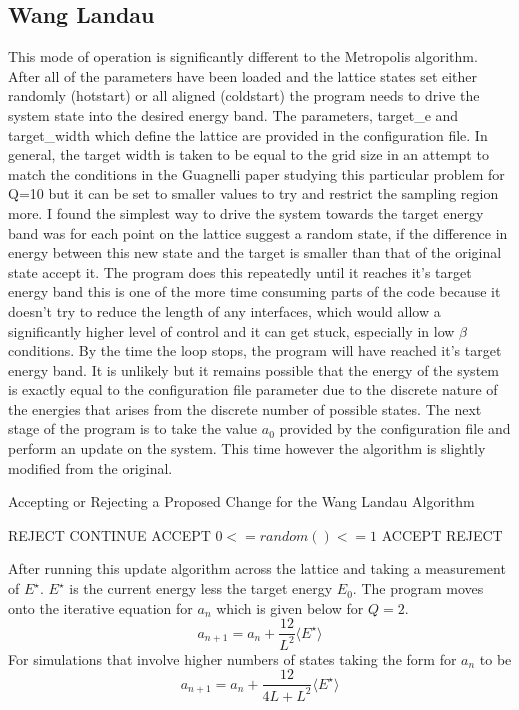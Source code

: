 \subsection{Wang Landau}
This mode of operation is significantly different to the Metropolis algorithm.
After all of the parameters have been loaded and the lattice states set either randomly (hotstart) or all aligned (coldstart) the program needs to drive the system state into the desired energy band.
The parameters, target\_e and target\_width which define the lattice are provided in the configuration file.
In general, the target width is taken to be equal to the grid size in an attempt to match the conditions in the Guagnelli paper studying this particular problem for Q=10\cite{1209.4443} but it can be set to smaller values to try and restrict the sampling region more.
I found the simplest way to drive the system towards the target energy band was for each point on the lattice suggest a random state, if the difference in energy between this new state and the target is smaller than that of the original state accept it.
The program does this repeatedly until it reaches it's target energy band this is one of the more time consuming parts of the code because it doesn't try to reduce the length of any interfaces, which would allow a significantly higher level of control and it can get stuck, especially in low $\beta$ conditions.
By the time the loop stops, the program will have reached it's target energy band. It is unlikely but it remains possible that the energy of the system is exactly equal to the configuration file parameter due to the discrete nature of the energies that arises from the discrete number of possible states.
The next stage of the program is to take the value $a_0$ provided by the configuration file and perform an update on the system.
This time however the algorithm is slightly modified from the original.
\begin{algorithm}
\caption{Accepting or Rejecting a Proposed Change for the Wang Landau Algorithm}
\begin{algorithmic}
	\STATE REJECT
\ELSE
	\STATE CONTINUE
		\STATE ACCEPT
	\ELSE
		\STATE $0 <= random() <= 1$
			\STATE ACCEPT
		\ELSE
			\STATE REJECT
		\ENDIF
	\ENDIF
\ENDIF
\end{algorithmic}
\end{algorithm}

After running this update algorithm across the lattice and taking a measurement of $E^\star$. $E^\star$ is the current energy less the target energy $E_0$.
The program moves onto the iterative equation for $a_n$ which is given below for $Q = 2$.
\begin{equation}
a_{n+1} = a_n + \frac{12}{L^2}\langle E^\star \rangle
\end{equation}
For simulations that involve higher numbers of states taking the form for $a_n$ to be
\begin{equation}
a_{n+1} = a_n + \frac{12}{4L+L^2}\langle E^\star \rangle
\end{equation}


